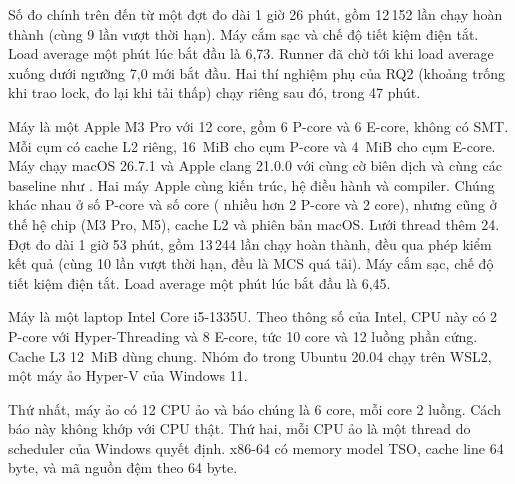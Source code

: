 Số đo chính trên  đến từ một đợt đo dài 1 giờ 26 phút, gồm 12\,152 lần chạy hoàn
thành (cùng 9 lần vượt thời hạn). Máy cắm sạc và chế độ tiết kiệm điện tắt. Load average một phút lúc
bắt đầu là 6,73. Runner đã chờ tới khi load average xuống dưới ngưỡng 7,0 mới bắt đầu. Hai thí nghiệm
phụ của RQ2 (khoảng trống khi trao lock, đo lại khi tải thấp) chạy riêng sau đó, trong 47 phút.

Máy  là một Apple M3 Pro với 12 core, gồm 6 P-core và 6 E-core, không có SMT.
Mỗi cụm có cache L2 riêng, 16~MiB cho cụm P-core và 4~MiB cho cụm E-core. Máy chạy macOS 26.7.1 và
Apple clang 21.0.0 với cùng cờ biên dịch và cùng các baseline như . Hai máy Apple
cùng kiến trúc, hệ điều hành và compiler. Chúng khác nhau ở số P-core và số core (
nhiều hơn 2 P-core và 2 core), nhưng cũng ở thế hệ chip (M3 Pro, M5), cache L2 và phiên bản macOS.
Lưới thread thêm 24. Đợt đo dài 1 giờ 53 phút, gồm
13\,244 lần chạy hoàn thành, đều qua phép kiểm kết quả (cùng 10 lần vượt thời hạn, đều là MCS quá tải).
Máy cắm sạc, chế độ tiết kiệm điện tắt. Load average
một phút lúc bắt đầu là 6,45.

Máy  là một laptop Intel Core i5-1335U. Theo thông số của Intel, CPU này có 2 P-core với
Hyper-Threading và 8 E-core, tức 10 core và 12 luồng phần cứng. Cache L3 12~MiB dùng chung. Nhóm đo
trong Ubuntu 20.04 chạy trên WSL2, một máy ảo Hyper-V của Windows 11.

Thứ nhất, máy ảo có 12 CPU ảo và báo chúng là 6
core, mỗi core 2 luồng. Cách báo này không khớp với CPU thật. Thứ hai, mỗi CPU ảo là một thread do
scheduler của Windows quyết định. x86-64 có memory model TSO, cache line 64 byte, và mã nguồn đệm theo
64 byte.

